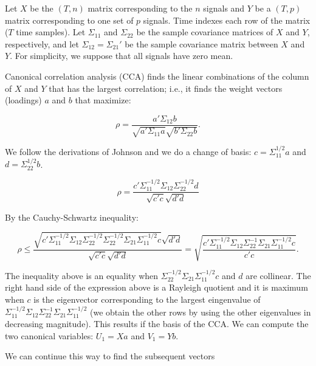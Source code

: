 \documentclass[12pt]{article}
\begin{document}
Let $X$ be the $(T,n)$ matrix corresponding to the $n$ signals and $Y$ be a $(T,p)$ matrix corresponding to one set of $p$ signals. Time indexes each row of the matrix ($T$ time samples). Let $\Sigma_{11}$ and $\Sigma_{22}$ be the sample covariance matrices of $X$ and $Y$, respectively, and let $\Sigma_{12}=\Sigma_{21}'$ be the sample covariance matrix between $X$ and $Y$. For simplicity, we suppose that all signals have zero mean.

Canonical correlation analysis (CCA) finds the linear combinations of the column of $X$ and $Y$ that has the largest correlation; i.e., it finds the weight vectors (loadings) $a$ and $b$ that maximize:

\begin{equation}
\rho=\frac{a' \Sigma_{12} b}{\sqrt{a' \Sigma_{11} a} \sqrt{b' \Sigma_{22} b}}.
\end{equation}

We follow the derivations of Johnson and we do a change of basis: $c=\Sigma_{11}^{1/2} a$ and $d=\Sigma_{22}^{1/2} b$. 

\begin{equation}
\rho=\frac{c' \Sigma_{11}^{-1/2} \Sigma_{12} \Sigma_{22}^{-1/2} d}{\sqrt{c' c} \sqrt{d' d}}
\end{equation}

By the Cauchy-Schwartz inequality:

\begin{equation}
\rho \le \frac{\sqrt{c' \Sigma_{11}^{-1/2} \Sigma_{12} \Sigma_{22}^{-1/2} \Sigma_{22}^{-1/2} \Sigma_{21} \Sigma_{11}^{-1/2} c} \sqrt{d' d}}{\sqrt{c' c} \sqrt{d' d}} = \sqrt{\frac{c' \Sigma_{11}^{-1/2} \Sigma_{12} \Sigma_{22}^{-1} \Sigma_{21} \Sigma_{11}^{-1/2} c}{c' c}}.
\end{equation}

The inequality above is an equality when $\Sigma_{22}^{-1/2} \Sigma_{21} \Sigma_{11}^{-1/2} c$ and $d$ are collinear. The right hand side of the expression above is a Rayleigh quotient and it is maximum when $c$ is the eigenvector corresponding to the largest eingenvalue of $\Sigma_{11}^{-1/2} \Sigma_{12} \Sigma_{22}^{-1} \Sigma_{21} \Sigma_{11}^{-1/2}$ (we obtain the other rows by using the other eigenvalues in decreasing magnitude). This results if the basis of the CCA. We can compute the two canonical variables: $U_1=X a$ and $V_1 = Y b$.

We can continue this way to find the subsequent vectors
\end{document}
